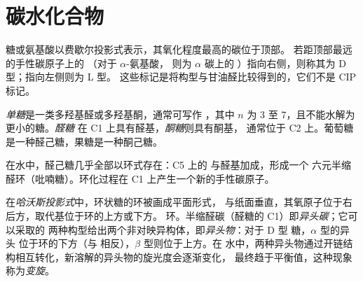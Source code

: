 \section{碳水化合物}

\begin{definition}[D 与 L]\label{def:b2:biomolecules:d-l}
糖或氨基酸以费歇尔投影式表示，其氧化程度最高的碳位于顶部。
若距顶部最远的手性碳原子上的 （对于 $\alpha$-氨基酸，
则为 $\alpha$ 碳上的 ）指向右侧，则称其为 D 型；指向左侧则为 L 型。
这些标记是将构型与甘油醛比较得到的，它们不是 CIP 标记。
\end{definition}

\begin{definition}[单糖]\label{def:b2:biomolecules:sugar}
\emph{单糖}是一类多羟基醛或多羟基酮，通常可写作
，其中 $n$ 为 3 至 7，且不能水解为更小的糖。\emph{醛糖}
在 C1 上具有醛基，\emph{酮糖}则具有酮基，
通常位于 C2 上。葡萄糖是一种醛己糖，果糖是一种酮己糖。
\end{definition}

在水中，醛己糖几乎全部以环式存在：C5 上的  与醛基加成，形成一个
六元半缩醛环（吡喃糖）。环化过程在 C1 上产生一个新的手性碳原子。

\begin{definition}[异头物]\label{def:b2:biomolecules:anomer}
在\emph{哈沃斯投影式}中，环状糖的环被画成平面形式，
与纸面垂直，其氧原子位于右后方，取代基位于环的上方或下方。
环。半缩醛碳（醛糖的 C1）即\emph{异头碳}；它可以采取的
两种构型给出两个非对映异构体，即\emph{异头物}：对于 D 型
糖，$\alpha$ 型的异头  位于环的下方（与  相反），$\beta$ 型则位于上方。在
水中，两种异头物通过开链结构相互转化，新溶解的异头物的旋光度会逐渐变化，
最终趋于平衡值，这种现象称为\emph{变旋}。
\end{definition}

